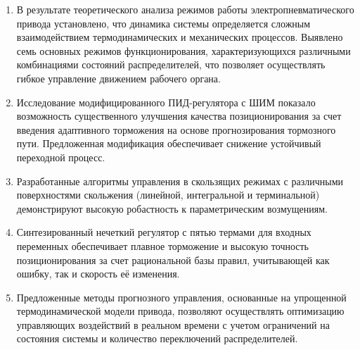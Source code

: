 \begin{enumerate}
\item В результате теоретического анализа режимов работы электропневматического привода установлено,
что динамика системы определяется сложным взаимодействием термодинамических и
механических процессов. Выявлено семь основных режимов функционирования, характеризующихся различными комбинациями состояний распределителей, что позволяет осуществлять
гибкое управление движением рабочего органа.

\item Исследование модифицированного ПИД-регулятора с ШИМ показало возможность
существенного улучшения качества позиционирования за счет
введения адаптивного торможения на основе прогнозирования тормозного пути.
Предложенная модификация обеспечивает снижение устойчивый переходной процесс.

\item Разработанные алгоритмы управления в скользящих режимах с различными поверхностями
скольжения (линейной, интегральной и терминальной) демонстрируют
высокую робастность к параметрическим возмущениям.

\item Синтезированный нечеткий регулятор с пятью термами для входных переменных
обеспечивает плавное торможение и высокую точность позиционирования за счет
рациональной базы правил, учитывающей как ошибку, так и скорость её изменения.

\item Предложенные методы прогнозного управления, основанные на
упрощенной термодинамической модели привода, позволяют осуществлять
оптимизацию управляющих воздействий в реальном времени
с учетом ограничений на состояния системы и количество переключений распределителей.
\end{enumerate}
